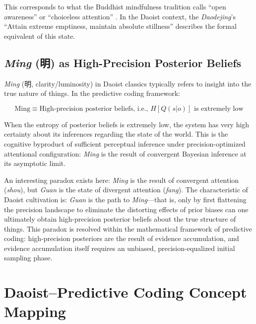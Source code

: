 \documentclass[11pt,a4paper]{article}
\begin{document}
This corresponds to what the Buddhist mindfulness tradition calls ``open awareness'' or ``choiceless attention'' \cite{Lutz2008}. In the Daoist context, the \textit{Daodejing}'s ``Attain extreme emptiness, maintain absolute stillness'' describes the formal equivalent of this state.

\subsection{\textit{Ming} (明) as High-Precision Posterior Beliefs}

\textit{Ming} (明, clarity/luminosity) in Daoist classics typically refers to insight into the true nature of things. In the predictive coding framework:

\begin{equation}
\text{Ming} \equiv \text{High-precision posterior beliefs, i.e., } H[Q(s|o)] \text{ is extremely low}
\label{eq:ming}
\end{equation}

When the entropy of posterior beliefs is extremely low, the system has very high certainty about its inferences regarding the state of the world. This is the cognitive byproduct of sufficient perceptual inference under precision-optimized attentional configuration: \textit{Ming} is the result of convergent Bayesian inference at its asymptotic limit.

An interesting paradox exists here: \textit{Ming} is the result of convergent attention (\textit{shou}), but \textit{Guan} is the state of divergent attention (\textit{fang}). The characteristic of Daoist cultivation is: \textit{Guan} is the path to \textit{Ming}---that is, only by first flattening the precision landscape to eliminate the distorting effects of prior biases can one ultimately obtain high-precision posterior beliefs about the true structure of things. This paradox is resolved within the mathematical framework of predictive coding: high-precision posteriors are the result of evidence accumulation, and evidence accumulation itself requires an unbiased, precision-equalized initial sampling phase.

\section{Daoist--Predictive Coding Concept Mapping}
\end{document}
